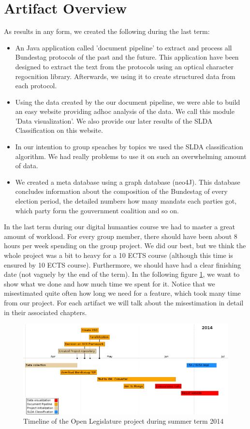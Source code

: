 \documentclass[12pt,paper=a4,nenglish]{scrreprt}
\begin{document}
\section{Artifact Overview}
\label{sec:artifact_overview}
As results in any form, we created the following during the last term:
\begin{itemize}
  \item An Java application called 'document pipeline' to extract and process
  all Bundestag protocols of the past and the future. 
  This application have been designed to extract the text from the protocols
  using an optical character regocnition library. Afterwards, we using it to
  create structured data from each protocol.
  \item Using the data created by the our document pipeline, we were able to
  build an easy website providing adhoc analysis of the data. We call this
  module 'Data visualization'. We also provide our later results of the SLDA
  Classification on this website.
  \item In our intention to group speaches by topics we used the SLDA
  classification algorithm. We had really problems to use it on such an
  overwhelming amount of data. 
  \item We created a meta database using a graph database (neo4J). This
  database concludes information about the composition of the Bundestag of
  every election period, the detailed numbers how many mandats each parties got,
  which party form the gouvernment coalition and so on. 
\end{itemize}
In the last term during our digital humanties course we had to master a great
amount of workload. For every group member, there should have been about 8 hours
per week spending on the group project. We did our best, but we think the whole
project was a bit to heavy for a 10 ECTS course (although this time is ensured
by 10 ECTS course). 
Furthermore, we should have had a clear finishing
date (not vaguely by the end of the term). In the following figure
\ref{pic:timeline}, we want to show what we done and how much time we spent for it. Notice that we
misestimated quite often how long we need for a feature, which took many time
from our project. For each artifact we will talk about the misestimation in
detail in their associated chapters.
\begin{figure}[H] 
	\centering
	\includegraphics[scale=0.7]{res/timeline_term.png}
	\caption{Timeline of the Open Legislature project during summer term 2014}%
	\label{pic:timeline}%
\end{figure}%
\end{document}
